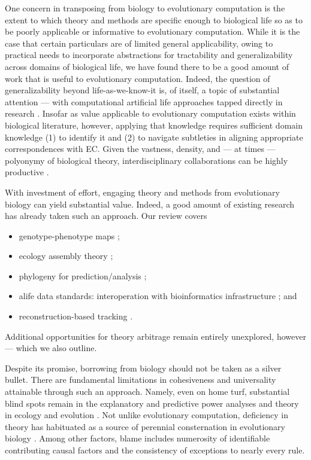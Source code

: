 One concern in transposing from biology to evolutionary computation is the extent to which theory and methods are specific enough to biological life so as to be poorly applicable or informative to evolutionary computation.
While it is the case that certain particulars are of limited general applicability, owing to practical needs to incorporate abstractions for tractability and generalizability across domains of biological life, we have found there to be a good amount of work that is useful to evolutionary computation.
Indeed, the question of generalizability beyond life-as-we-know-it is, of itself, a topic of substantial attention --- with computational artificial life approaches tapped directly in research \citep{cleland2013general}.
Insofar as value applicable to evolutionary computation exists within biological literature, however, applying that knowledge requires sufficient domain knowledge (1) to identify it and (2) to navigate subtleties in aligning appropriate correspondences with EC.
Given the vastness, density, and --- at times --- polyonymy of biological theory, interdisciplinary collaborations can be highly productive \citep{goodman2020evolution}.

With investment of effort, engaging theory and methods from evolutionary biology can yield substantial value.
Indeed, a good amount of existing research has already taken such an approach.
Our review covers
\begin{itemize}
  \item genotype-phenotype maps \citep{TODO};
  \item ecology assembly theory \citep{dolson2024reachability};
  \item phylogeny for prediction/analysis \citep{hernandez2022can,shahbandegan2022untangling,moreno2024ecology};
  \item alife data standards: interoperation with bioinformatics infrastructure \citep{lalejini2019data,moreno2024apc}; and
  \item reconstruction-based tracking \citep{moreno2022hstrat,moreno2024guide}.
\end{itemize}
Additional opportunities for theory arbitrage remain entirely unexplored, however --- which we also outline.

Despite its promise, borrowing from biology should not be taken as a silver bullet.
There are fundamental limitations in cohesiveness and universality attainable through such an approach.
Namely, even on home turf, substantial blind spots remain in the explanatory and predictive power analyses and theory in ecology and evolution \citep{TODO}.
Not unlike evolutionary computation, deficiency in theory has habituated as a source of perennial consternation in evolutionary biology \citep{welch2017wrong}.
Among other factors, blame includes numerosity of identifiable contributing causal factors and the consistency of exceptions to nearly every rule.

